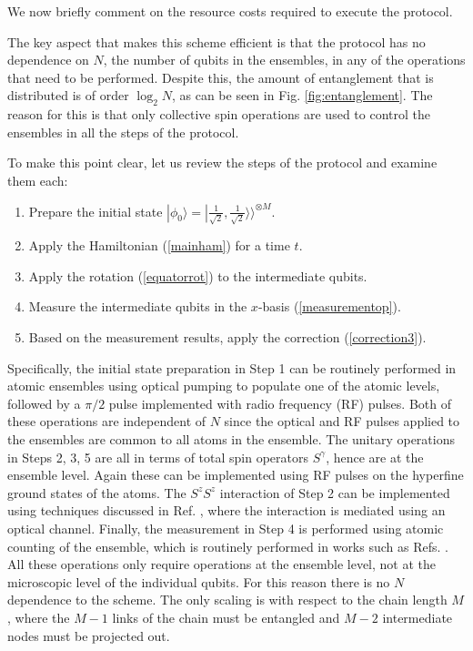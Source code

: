 \documentclass{WileyMSP-template}
\begin{document}
We now briefly comment on the resource costs required to execute the protocol.  {%
The key aspect that makes this scheme efficient is that the protocol has no dependence on $ N $, the number of qubits in the ensembles, in any of the operations that need to be performed.  Despite this, the amount of entanglement that is distributed is of order $ \log_2 N $, as can be seen in Fig. \ref{fig:entanglement}.  The reason for this is that only collective spin operations are used to control the ensembles in all the steps of the protocol.

To make this point clear, let us review the steps of the protocol and examine them each:
%
\begin{enumerate}
\item Prepare the initial state $ | \phi_0 \rangle = |\frac{1}{\sqrt{2}}, \frac{1}{\sqrt{2}} \rangle \rangle^{\otimes M} $.
\item Apply the Hamiltonian (\ref{mainham}) for a time $ t $.
\item Apply the rotation (\ref{equatorrot}) to the intermediate qubits.
\item Measure the intermediate qubits in the $ x $-basis (\ref{measurementop}).
\item Based on the measurement results, apply the correction (\ref{correction3}).
\end{enumerate}
%
Specifically, the initial state preparation in Step 1 can be routinely performed in atomic ensembles using optical pumping to populate one of the atomic levels, followed by a $ \pi/2 $ pulse implemented with radio frequency (RF) pulses. Both of these operations are independent of $ N $ since the optical and RF pulses applied to the ensembles are common to all atoms in the ensemble.  The unitary operations in Steps 2, 3, 5 are all in terms of total spin operators $ S^\gamma $, hence are at the ensemble level. Again these can be implemented using RF pulses on the hyperfine ground states of the atoms.  The $ S^z S^z $ interaction of Step 2 can be implemented using techniques discussed in Ref. \cite{pyrkov2013entanglement,hussain2014geometric}, where the interaction is mediated using an optical channel.  Finally, the measurement in Step 4 is performed using atomic counting of the ensemble, which is routinely performed in works such as Refs. \cite{Hume2013,Ott2016,Qu2020}.  All these operations only require operations at the ensemble level, not at the microscopic level of the individual qubits.  For this reason there is no $ N $ dependence to the scheme.  The only scaling is with respect to the chain length $ M $, where the $ M - 1 $ links of the chain must be entangled and $ M - 2$ intermediate nodes must be projected out.

}
\end{document}
